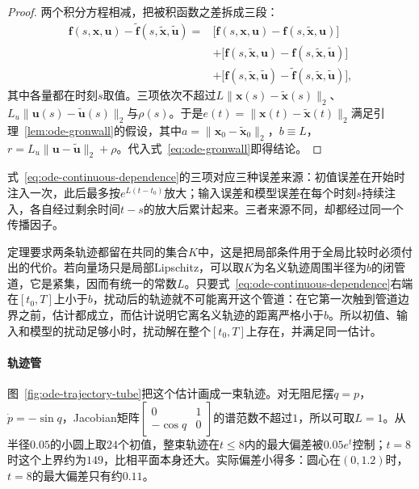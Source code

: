 \begin{proof}
  两个积分方程相减，把被积函数之差拆成三段：
  \[
    \begin{aligned}
    \bm f(s,\bm x,\bm u)-\widetilde{\bm f}(s,\widetilde{\bm x},\widetilde{\bm u})
    ={}&\bigl[\bm f(s,\bm x,\bm u)-\bm f(s,\widetilde{\bm x},\bm u)\bigr]\\
    &+\bigl[\bm f(s,\widetilde{\bm x},\bm u)-\bm f(s,\widetilde{\bm x},\widetilde{\bm u})\bigr]\\
    &+\bigl[\bm f(s,\widetilde{\bm x},\widetilde{\bm u})-\widetilde{\bm f}(s,\widetilde{\bm x},\widetilde{\bm u})\bigr],
    \end{aligned}
  \]
  其中各量都在时刻$s$取值。三项依次不超过$L\|\bm x(s)-\widetilde{\bm x}(s)\|_2$、$L_u\|\bm u(s)-\widetilde{\bm u}(s)\|_2$与$\rho(s)$。于是$e(t)=\|\bm x(t)-\widetilde{\bm x}(t)\|_2$满足引理~\ref{lem:ode-gronwall}的假设，其中$a=\|\bm x_0-\widetilde{\bm x}_0\|_2$，$b\equiv L$，$r=L_u\|\bm u-\widetilde{\bm u}\|_2+\rho$。代入式~\eqref{eq:ode-gronwall}即得结论。
\end{proof}

式~\eqref{eq:ode-continuous-dependence}的三项对应三种误差来源：初值误差在开始时注入一次，此后最多按$e^{L(t-t_0)}$放大；输入误差和模型误差在每个时刻$s$持续注入，各自经过剩余时间$t-s$的放大后累计起来。三者来源不同，却都经过同一个传播因子。

定理要求两条轨迹都留在共同的集合$K$中，这是把局部条件用于全局比较时必须付出的代价。若向量场只是局部Lipschitz，可以取$K$为名义轨迹周围半径为$b$的闭管道，它是紧集，因而有统一的常数$L$。只要式~\eqref{eq:ode-continuous-dependence}右端在$[t_0,T]$上小于$b$，扰动后的轨迹就不可能离开这个管道：在它第一次触到管道边界之前，估计都成立，而估计说明它离名义轨迹的距离严格小于$b$。所以初值、输入和模型的扰动足够小时，扰动解在整个$[t_0,T]$上存在，并满足同一估计。

\paragraph{轨迹管}
图~\ref{fig:ode-trajectory-tube}把这个估计画成一束轨迹。对无阻尼摆$\dot q=p$，$\dot p=-\sin q$，Jacobian矩阵$\begin{bmatrix}0&1\\-\cos q&0\end{bmatrix}$的谱范数不超过$1$，所以可取$L=1$。从半径$0.05$的小圆上取$24$个初值，整束轨迹在$t\leq8$内的最大偏差被$0.05e^t$控制；$t=8$时这个上界约为$149$，比相平面本身还大。实际偏差小得多：圆心在$(0,1.2)$时，$t=8$的最大偏差只有约$0.11$。

